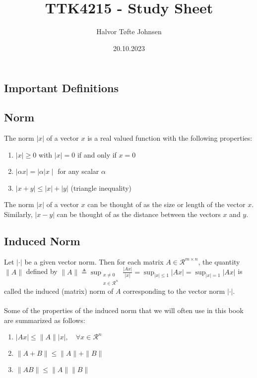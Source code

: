 \documentclass[10pt]{article}
\title{\Huge TTK4215 - Study Sheet}
\author{Halvor Tøfte Johnsen}
\date{20.10.2023}
\begin{document}
\maketitle
\begin{multicols*}{2}
\section{Important Definitions}
\subsection{Norm}
The norm $|x|$ of a vector $x$ is a real valued function with the following properties:
\begin{enumerate}[label=(\roman*)]
    \item $|x| \geq 0$ with $|x|=0$ if and only if $x=0$
    \item $|\alpha x|=|\alpha| x \mid$ for any scalar $\alpha$
    \item $|x+y| \leq|x|+|y|$ (triangle inequality)
\end{enumerate}
The norm $|x|$ of a vector $x$ can be thought of as the size or length of the vector $x$. Similarly, $|x-y|$ can be thought of as the distance between the vectors $x$ and $y$. 
\subsection{Induced Norm}
Let $|\cdot|$ be a given vector norm. Then for each matrix $A \in \mathcal{R}^{m \times n}$, the quantity $\|A\|$ defined by
\(
\|A\| \triangleq \sup _{\substack{x \neq 0 \\ x \in \mathcal{R}^n}} \frac{|A x|}{|x|}=\sup _{|x| \leq 1}|A x|=\sup _{|x|=1}|A x|
\)
is called the induced (matrix) norm of $A$ corresponding to the vector norm $|\cdot|$.
\\\\
Some of the properties of the induced norm that we will often use in this book are summarized as follows:
\begin{enumerate}[label=(\roman*)]
    \item $|A x| \leq\|A\||x|, \quad \forall x \in \mathcal{R}^n$
    \item $\|A+B\| \leq\|A\|+\|B\|$
    \item $\|A B\| \leq\|A\|\|B\|$
\end{enumerate}

\end{multicols*}
\end{document}

